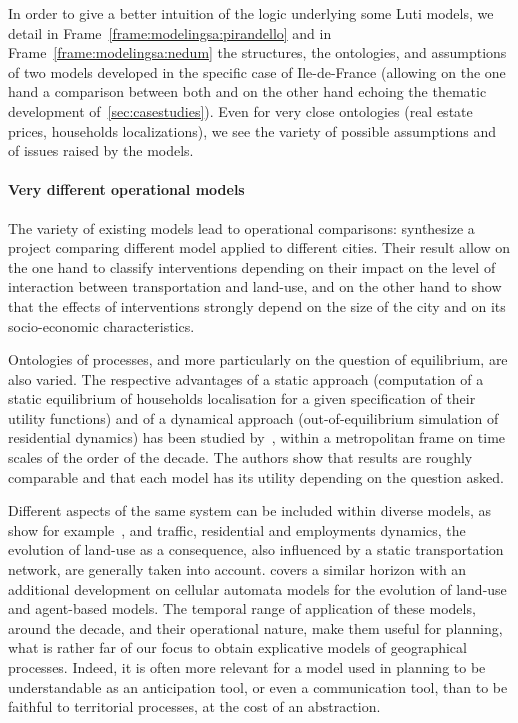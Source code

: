 \documentclass[galley]{jtlu-article-2col}
\begin{document}
In order to give a better intuition of the logic underlying some Luti models, we detail in Frame~\ref{frame:modelingsa:pirandello} and in Frame~\ref{frame:modelingsa:nedum} the structures, the ontologies, and assumptions of two models developed in the specific case of Ile-de-France (allowing on the one hand a comparison between both and on the other hand echoing the thematic development of~\ref{sec:casestudies}). Even for very close ontologies (real estate prices, households localizations), we see the variety of possible assumptions and of issues raised by the models.

\paragraph{Very different operational models}

The variety of existing models lead to operational comparisons: \cite{paulley1991overview} synthesize a project comparing different model applied to different cities. Their result allow on the one hand to classify interventions depending on their impact on the level of interaction between transportation and land-use, and on the other hand to show that the effects of interventions strongly depend on the size of the city and on its socio-economic characteristics.

Ontologies of processes, and more particularly on the question of equilibrium, are also varied. The respective advantages of a static approach (computation of a static equilibrium of households localisation for a given specification of their utility functions) and of a dynamical approach (out-of-equilibrium simulation of residential dynamics) has been studied by~\cite{kryvobokov2013comparison}, within a metropolitan frame on time scales of the order of the decade. The authors show that results are roughly comparable and that each model has its utility depending on the question asked.

Different aspects of the same system can be included within diverse models, as show for example~\cite{wegener1991one}, and traffic, residential and employments dynamics, the evolution of land-use as a consequence, also influenced by a static transportation network, are generally taken into account. \cite{iacono2008models} covers a similar horizon with an additional development on cellular automata models for the evolution of land-use and agent-based models. The temporal range of application of these models, around the decade, and their operational nature, make them useful for planning, what is rather far of our focus to obtain explicative models of geographical processes. Indeed, it is often more relevant for a model used in planning to be understandable as an anticipation tool, or even a communication tool, than to be faithful to territorial processes, at the cost of an abstraction.
\end{document}
